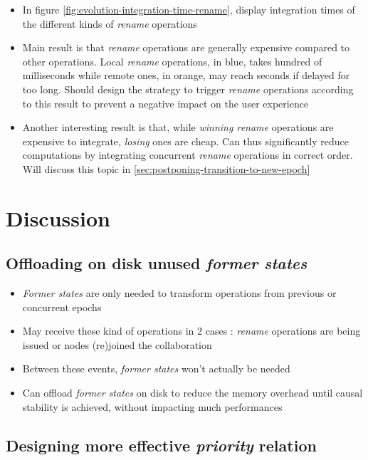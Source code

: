 \documentclass[sigplan,10pt]{acmart}
\begin{document}
\begin{itemize}
    \item In figure \autoref{fig:evolution-integration-time-rename}, display integration times of the different kinds of \emph{rename} operations
    \item Main result is that \emph{rename} operations are generally expensive compared to other operations. Local \emph{rename} operations, in blue, takes hundred of milliseconds while remote ones, in orange, may reach seconds if delayed for too long. Should design the strategy to trigger \emph{rename} operations according to this result to prevent a negative impact on the user experience
    \item Another interesting result is that, while \emph{winning rename} operations are expensive to integrate, \emph{losing} ones are cheap. Can thus significantly reduce computations by integrating concurrent \emph{rename} operations in correct order. Will discuss this topic in \autoref{sec:postponing-transition-to-new-epoch}
\end{itemize}

\section{Discussion}

\subsection{Offloading on disk unused \emph{former states}}
\label{sec:offloading-former-states}

\begin{itemize}
    \item \emph{Former states} are only needed to transform operations from previous or concurrent epochs
    \item May receive these kind of operations in 2 cases : \emph{rename} operations are being issued or nodes (re)joined the collaboration
    \item Between these events, \emph{former states} won't actually be needed
    \item Can offload \emph{former states} on disk to reduce the memory overhead until causal stability is achieved, without impacting much performances
\end{itemize}

\subsection{Designing more effective \emph{priority} relation}
\label{sec:designing-more-effective-priority-relation}
\end{document}
